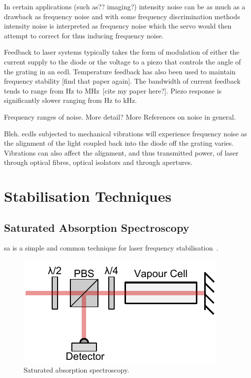 In certain applications {\color{red}(such as?? imaging?)} intensity noise can be as much as a drawback as frequency noise and with some frequency discrimination methods intensity noise is interpreted as frequency noise which the servo would then attempt to correct for thus inducing frequency noise.

Feedback to laser systems typically takes the form of modulation of either the current supply to the diode or the voltage to a piezo that controls the angle of the grating in an \gls{ecdl}.
Temperature feedback has also been used to maintain frequency stability {\color{red}[find that paper again]}.
The bandwidth of current feedback tends to range from \unit[0]{Hz} to MHz~\cite{ludlow_compact_2007}{\color{red}[cite my paper here?]}.
Piezo response is significantly slower ranging from \unit[0]{Hz} to \unit[100]{kHz}.

{\color{red}Frequency ranges of noise.}
{\color{red}More detail? More References on noise in general.}

Bleh.
\Glspl{ecdl} subjected to mechanical vibrations will experience frequency noise as the alignment of the light coupled back into the diode off the grating varies.
Vibrations can also affect the alignment, and thus transmitted power, of laser through optical fibres, optical isolators and through apertures.

\section{Stabilisation Techniques}
\subsection{Saturated Absorption Spectroscopy}
\Gls{sa} is a simple and common technique for laser frequency stabilisation~\cite{demtroder_laser_2003}.
 
\begin{figure}
\includegraphics[width=\linewidth]{part1/Figs/SatAbs.pdf}
\caption{Saturated absorption spectroscopy.}
\label{figure:satabs}
\end{figure}

